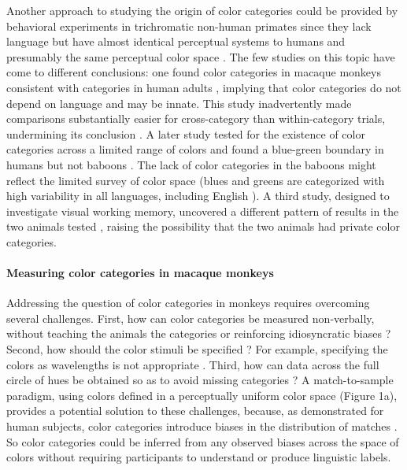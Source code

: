\documentclass[9pt,biorxiv,lineno,onehalfspacing]{lapreprint}
\begin{document}
\begin{refsection}
Another approach to studying the origin of color categories could be provided by behavioral experiments in trichromatic non-human primates \citep{sandell_color_1979,carey_where_2009,RN18699,siuda-krzywicka_biological_2019} since they lack language but have almost identical perceptual systems to humans and presumably the same perceptual color space \citep{schnapf_spectral_1987,stoughton_psychophysical_2012,gagin_color-detection_2014, horwitz_what_2015}. The few studies on this topic have come to different conclusions: one found color categories in macaque monkeys consistent with categories in human adults \citep{sandell_color_1979}, implying that color categories do not depend on language and may be innate.
This study inadvertently made comparisons substantially easier for cross-category than within-category trials, undermining its conclusion \citep{davidoff_cross-species_2010}. 
A later study tested for the existence of color categories across a limited range of colors and found a blue-green boundary in humans but not baboons \citep{fagot_cross-species_2006,RN18699}. The lack of color categories in the baboons might reflect the limited survey of color space (blues and greens are categorized with high variability in all languages, including English \citep{gibson_color_2017}). A third study, designed to investigate visual working memory, uncovered a different pattern of results in the two animals tested \citep{panichello_error-correcting_2019}, raising the possibility that the two animals had private color categories. 

\paragraph{Measuring color categories in macaque monkeys}

Addressing the question of color categories in monkeys requires overcoming several challenges. 
First, how can color categories be measured non-verbally, without teaching the animals the categories or reinforcing idiosyncratic biases \citep{essock_color_1977,matsuno_color_2004}? 
Second, how should the color stimuli be specified \citep{siuda-krzywicka_biological_2019}? 
For example, specifying the colors as wavelengths \citep{sandell_color_1979} is not appropriate \citep{davidoff_cross-species_2010}. 
Third, how can data across the full circle of hues be obtained so as to avoid missing categories \citep{fagot_cross-species_2006}? 
A match-to-sample paradigm, using colors defined in a perceptually uniform color space \citep{stockman_colorimetry_2010} (Figure 1a), provides a potential solution to these challenges, because, as demonstrated for human subjects, color categories introduce biases in the distribution of matches \citep{bae_why_2015}. 
So color categories could be inferred from any observed biases across the space of colors without requiring participants to understand or produce linguistic labels.  


\end{refsection}
\end{document}
